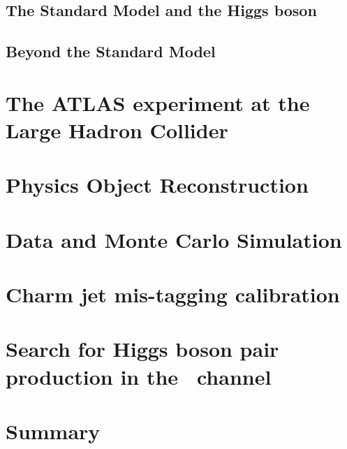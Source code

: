 \documentclass[twoside,11pt]{report}
\begin{document}
\section{The Standard Model and the Higgs boson}
\section{Beyond the Standard Model}
\large
\chapter{The ATLAS experiment at the Large Hadron Collider}


\chapter{Physics Object Reconstruction}



 
\chapter{Data and Monte Carlo Simulation}

\chapter{Charm jet mis-tagging calibration}





\large
\chapter{Search for Higgs boson pair production in the \bbtt\ channel}
\label{sec:search for dihiggs}




\clearpage

\clearpage

\label{sec:DiHiggs:systematics}
\clearpage






\chapter{Summary}
\printbibliography
\appendix


\end{document}

